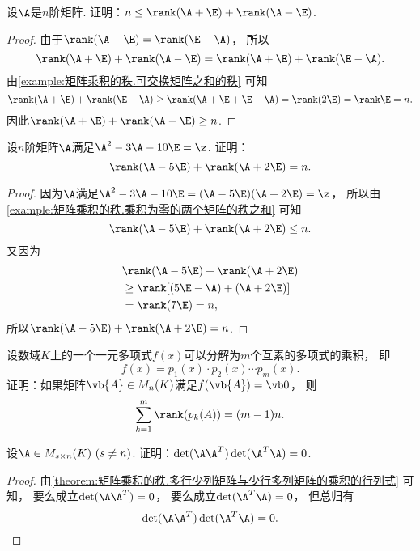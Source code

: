 \begin{example}\label{example:矩阵乘积的秩.矩阵的一次多项式的秩之和}
设\(\A\)是\(n\)阶矩阵.
证明：\(n \leq \rank(\A + \E) + \rank(\A - \E)\).
\begin{proof}
由于\(\rank(\A - \E) = \rank(\E - \A)\)，
所以\[
	\rank(\A + \E) + \rank(\A - \E)
	= \rank(\A + \E) + \rank(\E - \A).
\]
由\cref{example:矩阵乘积的秩.可交换矩阵之和的秩} 可知\[
	\rank(\A + \E) + \rank(\E - \A)
	\geq \rank(\A + \E + \E - \A)
	= \rank(2\E)
	= \rank\E
	= n.
\]
因此\(\rank(\A + \E) + \rank(\A - \E) \geq n\).
\end{proof}
\end{example}
\begin{example}\label{example:矩阵乘积的秩.矩阵的多项式的各个互素因式的秩之和}
设\(n\)阶矩阵\(\A\)满足\(\A^2 - 3 \A - 10 \E = \z\).
证明：\[
	\rank(\A - 5\E) + \rank(\A + 2\E) = n.
\]
\begin{proof}
因为\(\A\)满足\(\A^2 - 3 \A - 10 \E = (\A - 5\E)(\A + 2\E) = \z\)，
所以由\cref{example:矩阵乘积的秩.乘积为零的两个矩阵的秩之和} 可知\[
	\rank(\A - 5\E) + \rank(\A + 2\E) \leq n.
\]
又因为\begin{align*}
	&\rank(\A - 5\E) + \rank(\A + 2\E) \\
	&\geq \rank[(5\E - \A) + (\A + 2\E)] \\
	&= \rank(7\E)
	= n,
\end{align*}
所以\(\rank(\A - 5\E) + \rank(\A + 2\E) = n\).
\end{proof}
\end{example}
\begin{example}
设数域\(K\)上的一个一元多项式\(f(x)\)可以分解为\(m\)个互素的多项式的乘积，
即\[
	f(x) = p_1(x) \cdot p_2(x) \dotsm p_m(x).
\]
证明：如果矩阵\(\vb{A} \in M_n(K)\)满足\(f(\vb{A}) = \vb0\)，
则\[
	\sum_{k=1}^m \rank(p_k(A))
	= (m-1)n.
\]
\end{example}

\begin{example}
设\(\A \in M_{s \times n}(K)\ (s \neq n)\).
证明：\(\det(\A \A^T) \det(\A^T \A) = 0\).
\begin{proof}
由\cref{theorem:矩阵乘积的秩.多行少列矩阵与少行多列矩阵的乘积的行列式} 可知，
要么成立\(\det(\A \A^T) = 0\)，
要么成立\(\det(\A^T \A) = 0\)，
但总归有\[
	\det(\A \A^T) \det(\A^T \A) = 0.
	\qedhere
\]
\end{proof}
\end{example}

